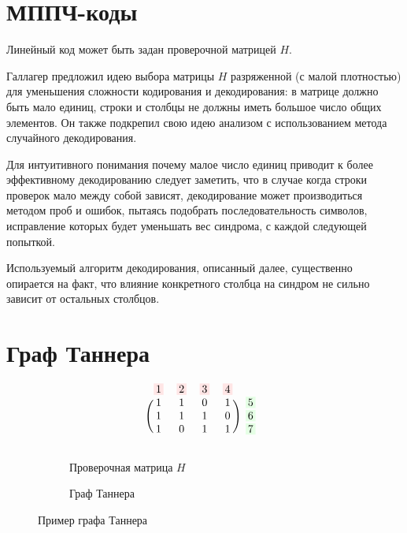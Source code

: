 \section{МППЧ-коды}

Линейный код может быть задан проверочной матрицей $H$.

Галлагер \cite{gallager} предложил идею выбора матрицы $H$ разряженной (с малой плотностью) для уменьшения
 сложности кодирования и декодирования: в матрице должно быть мало единиц, строки и столбцы не должны 
 иметь большое число  общих элементов. Он также подкрепил свою идею анализом с использованием 
 метода случайного декодирования.
 
 Для интуитивного понимания почему малое число единиц приводит к более эффективному декодированию следует
 заметить, что в случае когда строки проверок мало между собой зависят, декодирование может производиться 
 методом проб и ошибок, пытаясь подобрать последовательность символов, исправление которых будет уменьшать
 вес синдрома, с каждой следующей попыткой.
 
 Используемый алгоритм декодирования, описанный далее, существенно опирается на факт, что влияние конкретного
 столбца на синдром не сильно зависит от остальных столбцов.
 



\section{Граф Таннера}

\newcommand\colorBox[2]{\setlength{\fboxsep}{2pt}\colorbox{#1!10}{#2}}

\begin{figure}[h!]
\centering
\begin{subfigure}{.3\textwidth}
  \centering
  \[
    \begin{blockarray}{ccccc}
        \colorBox{red}{1} & \colorBox{red}{2} & \colorBox{red}{3} & \colorBox{red}{4} \\
        \begin{block}{(cccc)c}
            1&1&0&1&\colorBox{green}{5}\\
            1&1&1&0&\colorBox{green}{6}\\
            1&0&1&1&\colorBox{green}{7} \\
        \end{block}
    \end{blockarray}
  \]
  \caption{Проверочная матрица $H$}
  \label{checkMatrix}
\end{subfigure}%
\begin{subfigure}{.7\textwidth}
  \centering
  \caption{Граф Таннера}
  \label{checkMatrix}
\end{subfigure}
\caption{Пример графа Таннера}
\end{figure}

